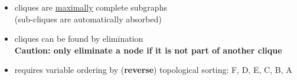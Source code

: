 \begin{frame} \frametitle{\subsecname
}
					\slidesonly{\vspace{5mm}}
				\begin{itemize}
					\item cliques are \underline{maximally} complete subgraphs\\
					(sub-cliques are automatically absorbed)
					\item cliques can be found by elimination \\
					
					\slidesonly{\vspace{10mm}}
					\textbf{Caution: only eliminate a node if it is not part of another clique}
					\slidesonly{\vspace{5mm}}
					\item requires variable ordering by (\textbf{reverse}) topological sorting: 
						F, D, E, C, B, A
				\end{itemize}
	
	
	

\end{frame}

